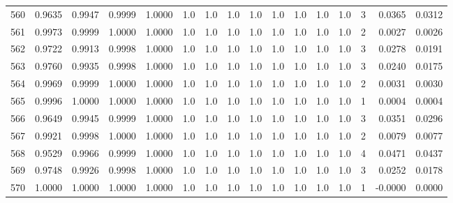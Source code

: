 \begin{tabular}{lrrrrrrrrrrrrrrr}
560 &      0.9635 &  0.9947 &  0.9999 &  1.0000 &     1.0 &     1.0 &     1.0 &     1.0 &     1.0 &     1.0 &      1.0 &        1.0 &      3 &                    0.0365 &                     0.0312 \\
561 &      0.9973 &  0.9999 &  1.0000 &  1.0000 &     1.0 &     1.0 &     1.0 &     1.0 &     1.0 &     1.0 &      1.0 &        1.0 &      2 &                    0.0027 &                     0.0026 \\
562 &      0.9722 &  0.9913 &  0.9998 &  1.0000 &     1.0 &     1.0 &     1.0 &     1.0 &     1.0 &     1.0 &      1.0 &        1.0 &      3 &                    0.0278 &                     0.0191 \\
563 &      0.9760 &  0.9935 &  0.9998 &  1.0000 &     1.0 &     1.0 &     1.0 &     1.0 &     1.0 &     1.0 &      1.0 &        1.0 &      3 &                    0.0240 &                     0.0175 \\
564 &      0.9969 &  0.9999 &  1.0000 &  1.0000 &     1.0 &     1.0 &     1.0 &     1.0 &     1.0 &     1.0 &      1.0 &        1.0 &      2 &                    0.0031 &                     0.0030 \\
565 &      0.9996 &  1.0000 &  1.0000 &  1.0000 &     1.0 &     1.0 &     1.0 &     1.0 &     1.0 &     1.0 &      1.0 &        1.0 &      1 &                    0.0004 &                     0.0004 \\
566 &      0.9649 &  0.9945 &  0.9999 &  1.0000 &     1.0 &     1.0 &     1.0 &     1.0 &     1.0 &     1.0 &      1.0 &        1.0 &      3 &                    0.0351 &                     0.0296 \\
567 &      0.9921 &  0.9998 &  1.0000 &  1.0000 &     1.0 &     1.0 &     1.0 &     1.0 &     1.0 &     1.0 &      1.0 &        1.0 &      2 &                    0.0079 &                     0.0077 \\
568 &      0.9529 &  0.9966 &  0.9999 &  1.0000 &     1.0 &     1.0 &     1.0 &     1.0 &     1.0 &     1.0 &      1.0 &        1.0 &      4 &                    0.0471 &                     0.0437 \\
569 &      0.9748 &  0.9926 &  0.9998 &  1.0000 &     1.0 &     1.0 &     1.0 &     1.0 &     1.0 &     1.0 &      1.0 &        1.0 &      3 &                    0.0252 &                     0.0178 \\
570 &      1.0000 &  1.0000 &  1.0000 &  1.0000 &     1.0 &     1.0 &     1.0 &     1.0 &     1.0 &     1.0 &      1.0 &        1.0 &      1 &                   -0.0000 &                     0.0000 \\

\end{tabular}
